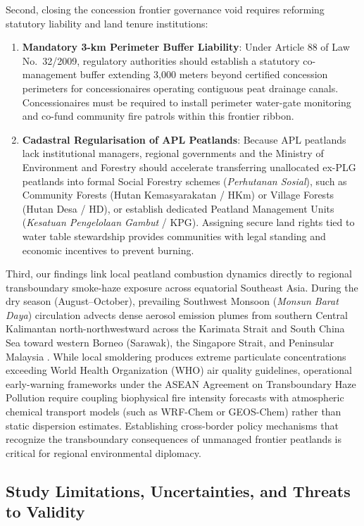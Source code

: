 Second, closing the concession frontier governance void requires reforming statutory liability and land tenure institutions:
\begin{enumerate}
    \item \textbf{Mandatory 3-km Perimeter Buffer Liability}: Under Article 88 of Law No.~32/2009, regulatory authorities should establish a statutory co-management buffer extending 3,000 meters beyond certified concession perimeters for concessionaires operating contiguous peat drainage canals. Concessionaires must be required to install perimeter water-gate monitoring and co-fund community fire patrols within this frontier ribbon.
    \item \textbf{Cadastral Regularisation of APL Peatlands}: Because APL peatlands lack institutional managers, regional governments and the Ministry of Environment and Forestry should accelerate transferring unallocated ex-PLG peatlands into formal Social Forestry schemes (\textit{Perhutanan Sosial}), such as Community Forests (Hutan Kemasyarakatan / HKm) or Village Forests (Hutan Desa / HD), or establish dedicated Peatland Management Units (\textit{Kesatuan Pengelolaan Gambut} / KPG). Assigning secure land rights tied to water table stewardship provides communities with legal standing and economic incentives to prevent burning.
\end{enumerate}

Third, our findings link local peatland combustion dynamics directly to regional transboundary smoke-haze exposure across equatorial Southeast Asia. During the dry season (August--October), prevailing Southwest Monsoon (\textit{Monsun Barat Daya}) circulation advects dense aerosol emission plumes from southern Central Kalimantan north-northwestward across the Karimata Strait and South China Sea toward western Borneo (Sarawak), the Singapore Strait, and Peninsular Malaysia \citep{Gaveau2014PLOSONE, Kiely2021ACP}. While local smoldering produces extreme particulate concentrations exceeding World Health Organization (WHO) air quality guidelines, operational early-warning frameworks under the ASEAN Agreement on Transboundary Haze Pollution require coupling biophysical fire intensity forecasts with atmospheric chemical transport models (such as WRF-Chem or GEOS-Chem) rather than static dispersion estimates. Establishing cross-border policy mechanisms that recognize the transboundary consequences of unmanaged frontier peatlands is critical for regional environmental diplomacy.

\subsection{Study Limitations, Uncertainties, and Threats to Validity}
\label{subsec:disc_limitations}

